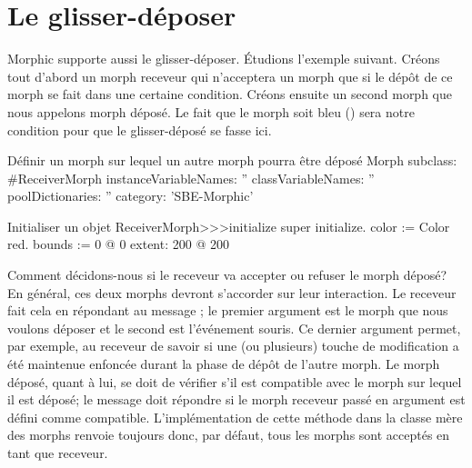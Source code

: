 \documentclass[a4paper,10pt,twoside]{book}
\begin{document}

\section{Le glisser-déposer}

Morphic supporte aussi le glisser-déposer. Étudions l'exemple
suivant. Créons tout d'abord un morph receveur qui n'acceptera un
morph que si le dépôt de ce morph se fait dans une certaine
condition. Créons ensuite un second morph que nous appelons morph
déposé. Le fait que le morph soit bleu () sera
notre condition pour que le glisser-déposé se fasse ici.

\begin{classdef}{Définir un morph sur lequel un autre morph pourra être déposé}
Morph subclass: #ReceiverMorph
	instanceVariableNames: ''
	classVariableNames: ''
	poolDictionaries: ''
	category: 'SBE-Morphic'
\end{classdef}

\begin{method}{Initialiser un objet }
ReceiverMorph>>>initialize
	super initialize.
	color := Color red.
	bounds := 0 @ 0 extent: 200 @ 200
\end{method}

Comment décidons-nous si le receveur va accepter ou refuser le morph
déposé? En général, ces deux morphs devront s'accorder sur
leur interaction. Le receveur fait cela en répondant au message
 ; le premier argument est le
 morph que nous voulons déposer et le second est l'événement
 souris. Ce dernier argument permet, par exemple, au receveur de
 savoir si une (ou plusieurs) touche de modification a été
 maintenue enfoncée durant la phase de dépôt de l'autre morph.
Le morph déposé, quant \`a lui, se doit de vérifier s'il est
compatible avec le morph sur lequel il est déposé; le message
 doit répondre  si le morph
receveur 
passé en argument est défini comme compatible. L'implémentation
de cette méthode dans la classe mère des morphs  renvoie
toujours  
donc, par défaut, tous les morphs sont acceptés en tant que
receveur.
\end{document}
